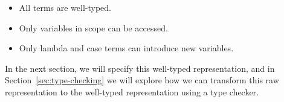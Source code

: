 \begin{itemize}
\item All terms are well-typed.
\item Only variables in scope can be accessed.
\item Only lambda and case terms can introduce new variables. 
\end{itemize}

In the next section, we will specify this well-typed representation, and in Section~\ref{sec:type-checking} we will explore how we can transform this raw representation to the well-typed representation using a type checker.

